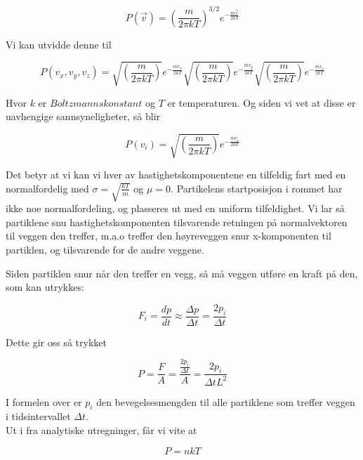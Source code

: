 \documentclass[a4paper,norsk,11pt,twoside]{article}
\begin{document}
\begin{equation}
P(\vec{v}) = \left( \frac{m}{2 \pi k T} \right)^{3/2} e^{-\frac{m\vec{v}}{2kT}}
\end{equation}

Vi kan utvidde denne til 

\begin{equation}
P(v_x,v_y,v_z) = \sqrt{\left( \frac{m}{2 \pi k T} \right)} e^{-\frac{m v_x}{2kT}}\sqrt{\left( \frac{m}{2 \pi k T} \right)} e^{-\frac{m v_y}{2kT}}\sqrt{\left( \frac{m}{2 \pi k T} \right)} e^{-\frac{m v_z}{2kT}}
\end{equation}

Hvor $k$ er $Boltzmanns konstant$ og $T$ er temperaturen.
Og siden vi vet at disse er uavhengige sannsyneligheter, så blir

\begin{equation}
P(v_i) = \sqrt{\left( \frac{m}{2 \pi k T} \right)} e^{-\frac{m v_i}{2kT}}
\end{equation}

Det betyr at vi kan vi hver av hastighetskomponentene en tilfeldig fart med en normalfordelig med $\sigma = \sqrt{ \frac{kT}{m}}$
og $\mu = 0$. Partikelens startposisjon i rommet har ikke noe normalfordeling, og plasseres ut med en uniform tilfeldighet.
Vi lar så partiklene snu hastighetskomponenten tilsvarende retningen på normalvektoren til veggen den treffer, m.a.o treffer den høyreveggen snur x-komponenten til partiklen, og tilsvarende for de andre veggene. 

Siden partiklen snur når den treffer en vegg, så må veggen utføre en kraft på den, som kan utrykkes:

\begin{equation}
F_i = \frac{dp}{dt} \approx \frac{\Delta p}{\Delta t} = \frac{2p_i}{\Delta t}
\end{equation}

Dette gir oss så trykket

\begin{equation}
P = \frac{F}{A} = \frac{\frac{2p_i}{\Delta t}}{A} = \frac{2p_i}{\Delta t L^{2}}
\end{equation}

I formelen over er $p_i$ den bevegelsesmengden til alle partiklene som treffer veggen i tidsintervallet $\Delta t$.\\
Ut i fra analytiske utregninger, får vi vite at

\begin{equation}
P = nkT
\end{equation}
\end{document}

